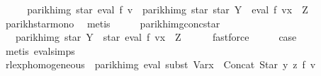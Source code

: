 \begin{isabellebody}
\ \ \isamarkupfalse%
\ \isamarkupfalse%
\ {\isachardoublequoteopen}parikh{\isacharunderscore}{\kern0pt}img\ {\isacharparenleft}{\kern0pt}star\ {\isacharparenleft}{\kern0pt}eval\ f\ v{\isacharparenright}{\kern0pt}{\isacharparenright}{\kern0pt}\ {\isasymsubseteq}\ parikh{\isacharunderscore}{\kern0pt}img\ {\isacharparenleft}{\kern0pt}star\ {\isacharparenleft}{\kern0pt}star\ Y\ {\isacharat}{\kern0pt}{\isacharat}{\kern0pt}\ eval\ f\ {\isacharparenleft}{\kern0pt}v{\isacharparenleft}{\kern0pt}x\ {\isacharcolon}{\kern0pt}{\isacharequal}{\kern0pt}\ Z{\isacharparenright}{\kern0pt}{\isacharparenright}{\kern0pt}{\isacharparenright}{\kern0pt}{\isacharparenright}{\kern0pt}{\isachardoublequoteclose}\isanewline
\ \ \ \ \isamarkupfalse%
\ parikh{\isacharunderscore}{\kern0pt}star{\isacharunderscore}{\kern0pt}mono\ \isamarkupfalse%
\ metis\isanewline
\ \ \isamarkupfalse%
\ \isamarkupfalse%
\ parikh{\isacharunderscore}{\kern0pt}img{\isacharunderscore}{\kern0pt}conc{\isacharunderscore}{\kern0pt}star\ \isamarkupfalse%
\ {\isachardoublequoteopen}{\isasymdots}\ {\isasymsubseteq}\ parikh{\isacharunderscore}{\kern0pt}img\ {\isacharparenleft}{\kern0pt}star\ Y\ {\isacharat}{\kern0pt}{\isacharat}{\kern0pt}\ star\ {\isacharparenleft}{\kern0pt}eval\ f\ {\isacharparenleft}{\kern0pt}v{\isacharparenleft}{\kern0pt}x\ {\isacharcolon}{\kern0pt}{\isacharequal}{\kern0pt}\ Z{\isacharparenright}{\kern0pt}{\isacharparenright}{\kern0pt}{\isacharparenright}{\kern0pt}{\isacharparenright}{\kern0pt}{\isachardoublequoteclose}\isanewline
\ \ \ \ \isamarkupfalse%
\ fastforce\isanewline
\ \ \isamarkupfalse%
\ \isamarkupfalse%
\ {\isacharquery}{\kern0pt}case\ \isamarkupfalse%
\ {\isacharparenleft}{\kern0pt}metis\ eval{\isachardot}{\kern0pt}simps{\isacharparenleft}{\kern0pt}{}{\isacharparenright}{\kern0pt}{\isacharparenright}{\kern0pt}\isanewline
{}\isamarkupfalse%
%
\endisatagproof
{\isafoldproof}%
%
\isadelimproof
\isanewline
%
\endisadelimproof
\isanewline
{}\isamarkupfalse%
\ rlexp{\isacharunderscore}{\kern0pt}homogeneous{\isacharcolon}{\kern0pt}\ \ {\isachardoublequoteopen}parikh{\isacharunderscore}{\kern0pt}img\ {\isacharparenleft}{\kern0pt}eval\ {\isacharparenleft}{\kern0pt}subst\ {\isacharparenleft}{\kern0pt}Var{\isacharparenleft}{\kern0pt}x\ {\isacharcolon}{\kern0pt}{\isacharequal}{\kern0pt}\ Concat\ {\isacharparenleft}{\kern0pt}Star\ y{\isacharparenright}{\kern0pt}\ z{\isacharparenright}{\kern0pt}{\isacharparenright}{\kern0pt}\ f{\isacharparenright}{\kern0pt}\ v{\isacharparenright}{\kern0pt}\isanewline

\end{isabellebody}
